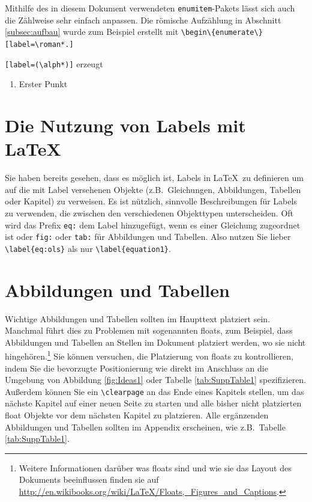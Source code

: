 \documentclass[a4paper,12pt]{scrartcl} %
\begin{document}
Mithilfe des in diesem Dokument verwendeten \texttt{enumitem}-Pakets lässt sich auch die Zählweise sehr einfach anpassen. Die römische Aufzählung in Abschnitt \ref{subsec:aufbau} wurde zum Beispiel erstellt mit
\verb|\begin\{enumerate\}[label=\roman*.]|

\verb|[label=(\alph*)]| erzeugt
\begin{enumerate}[label=(\alph*)]
  \item Erster Punkt
\end{enumerate}



\section{Die Nutzung von Labels mit \LaTeX}

Sie haben bereits gesehen, dass es möglich ist, Labels in \LaTeX\ zu definieren um auf die mit Label versehenen Objekte (z.B.\ Gleichungen, Abbildungen, Tabellen oder Kapitel) zu verweisen. Es ist nützlich, sinnvolle Beschreibungen für Labels zu verwenden, die zwischen den verschiedenen Objekttypen unterscheiden. Oft wird das Prefix \texttt{eq:} dem Label hinzugefügt, wenn es einer Gleichung zugeordnet ist oder \texttt{fig:} oder \texttt{tab:} für Abbildungen und Tabellen. Also nutzen Sie lieber \verb|\label{eq:ols}| als nur \verb|\label{equation1}|.


\section{Abbildungen und Tabellen}

Wichtige Abbildungen und Tabellen sollten im Haupttext platziert sein. Manchmal führt dies zu Problemen mit sogenannten floats, zum Beispiel, dass Abbildungen und Tabellen an Stellen im Dokument platziert werden, wo sie nicht hingehören.\footnote{Weitere Informationen darüber was floats sind und wie sie das Layout des Dokuments beeinflussen finden sie auf \url{http://en.wikibooks.org/wiki/LaTeX/Floats,_Figures_and_Captions}.} Sie können versuchen, die Platzierung von floats zu kontrollieren, indem Sie die bevorzugte Positionierung wie direkt im Anschluss an die Umgebung von Abbildung \ref{fig:Ideas1} oder Tabelle \ref{tab:SuppTable1} spezifizieren. Außerdem können Sie ein \verb|\clearpage| an das Ende eines Kapitels stellen, um das nächste Kapitel auf einer neuen Seite zu starten und alle bisher nicht platzierten float Objekte vor dem nächsten Kapitel zu platzieren. Alle ergänzenden Abbildungen und Tabellen sollten im Appendix erscheinen, wie z.B.\ Tabelle \ref{tab:SuppTable1}.
\end{document}
